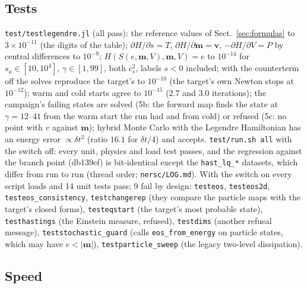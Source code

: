 \documentclass[11pt,aps,preprint,nofootinbib,superscriptaddress,tightenlines]{revtex4-2}
\def\Sect#1{Sect.~\ref{#1}}
\begin{document}
\subsection{Tests}

\nolinkurl{test/testlegendre.jl} (all pass): the reference values of \Sect{sec:formulas} to $3\times10^{-11}$ (the digits of the table); $\partial H/\partial s=T$,
$\partial H/\partial\bm m=\bm v$, $-\partial H/\partial V=P$ by central differences to $10^{-9}$; $H(S(e,\bm m,V),\bm m,V)=e$ to $10^{-14}$ for $s_a\in[10,10^4]$,
$\gamma\in[1,99]$, both $c_s^2$, labels $s<0$ included; with the counterterm off the solves reproduce the target's to $10^{-10}$ (the target's own Newton stops at
$10^{-12}$); warm and cold starts agree to $10^{-15}$ (2.7 and 3.0 iterations); the campaign's failing states are solved (5b: the forward map finds
the state at $\gamma=12$--$41$ from the warm start the run had and from cold) or refused (5c: no point with $v$ against $\bm m$); hybrid Monte Carlo with the Legendre Hamiltonian has an energy error $\propto\delta t^2$
(ratio $16.1$ for $\delta t/4$) and accepts.  \texttt{test/run.sh all} with the switch off: every unit, physics and load test passes, and the regression against
the branch point (db139ef) is bit-identical except the \texttt{hast\_lq\_*} datasets, which differ from run to run (thread order; \nolinkurl{nersc/LOG.md}).  With the
switch on every script loads and 14 unit tests pass; 9 fail by design: \texttt{testeos}, \texttt{testeos2d}, \texttt{testeos\_consistency}, \texttt{testchangerep}
(they compare the particle maps with the target's closed forms), \texttt{testeqstart} (the target's most probable state), \texttt{testhastings} (the Einstein
measure, refused), \texttt{testdims} (another refusal message), \texttt{teststochastic\_guard} (calls \texttt{eos\_from\_energy} on particle states, which may have
$e<|\bm m|$), \texttt{testparticle\_sweep} (the legacy two-level dissipation).

\subsection{Speed}
\end{document}
